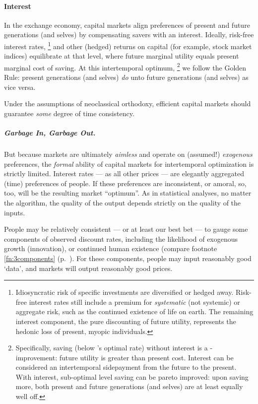 \paragraph{Interest}
	\label{sec:interest}
In the exchange economy, capital markets align preferences of present and future generations (and selves) by compensating savers with an interest.
Ideally, risk-free interest rates,
\footnote{
	Idiosyncratic risk of specific investments are diversified or hedged away.
	Risk-free interest rates still include a premium for \emph{systematic} (not systemic) or aggregate risk, such as the continued existence of life on earth.
	The remaining interest component, the pure discounting of future utility, represents the hedonic loss of present, myopic individuals.
}
and other (hedged) returns on capital (for example, stock market indices) equilibrate at that level, where future marginal utility equals present marginal cost of saving.
At this intertemporal optimum,
\footnote{
	Specifically, saving (below \citeauthor{Solow1956}'s optimal rate) without interest is a \citeauthor{Kaldor1939}-\citeauthor{Hicks1939} improvement:
	future utility is greater than present cost.
	Interest can be considered an intertemporal sidepayment from the future to the present.
	With interest, sub-optimal level saving can be pareto improved:
	upon saving more, both present and future generations (and selves) are at least equally well off.
}
we follow the Golden Rule:
present generations (and selves) \emph{do} unto future generations (and selves) as vice versa.

Under the assumptions of neoclassical orthodoxy, efficient capital markets should guarantee \emph{some} degree of time consistency.

\subparagraph{Garbage In, Garbage Out.}
But because markets are ultimately \emph{aimless} and operate on (assumed!) \emph{exogenous} preferences, the \emph{formal} ability of capital markets for intertemporal optimization is strictly limited.
Interest rates --- as all other prices --- are elegantly aggregated (time) preferences of people.
If these preferences are inconsistent, or amoral, so, too, will be the resulting market ``optimum''.
As in statistical analyses, no matter the algorithm, the quality of the output depends strictly on the quality of the inputs.

People may be relatively consistent --- or at least our best bet --- to gauge some components of observed discount rates, including the likelihood of exogenous growth (innovation), or continued human existence (compare footnote \ref{fn:3components} (p.~\pageref{fn:3components}).
For these components, people may input reasonably good `data', and markets will output reasonably good prices.

